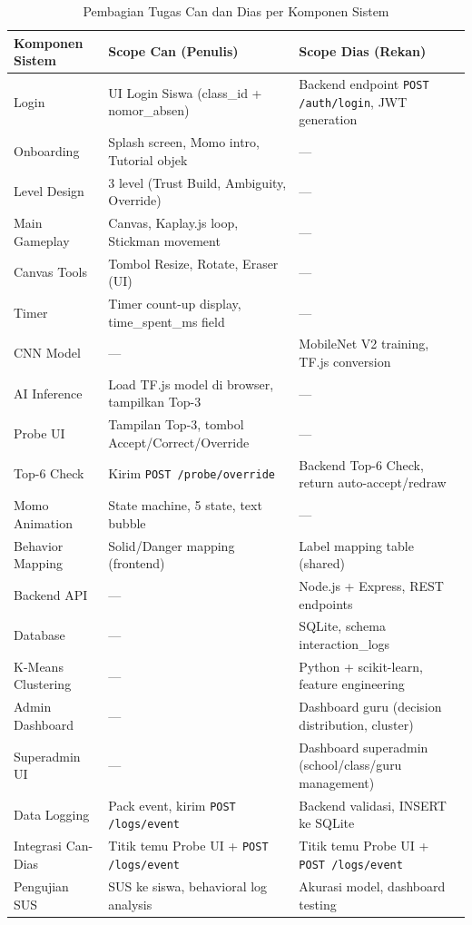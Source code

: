 \documentclass[12pt,a4paper,oneside,openany]{report}
\begin{document}
\begin{table}[H]
\centering
\caption{Pembagian Tugas Can dan Dias per Komponen Sistem}
\label{tab:pembagian-tugas}
\begin{tabular}{|p{4cm}|p{4.5cm}|p{4.5cm}|}
\hline
\textbf{Komponen Sistem} & \textbf{Scope Can (Penulis)} & \textbf{Scope Dias (Rekan)} \\ \hline
Login & UI Login Siswa (class\_id + nomor\_absen) & Backend endpoint \texttt{POST /auth/login}, JWT generation \\ \hline
Onboarding & Splash screen, Momo intro, Tutorial objek & --- \\ \hline
Level Design & 3 level (Trust Build, Ambiguity, Override) & --- \\ \hline
Main Gameplay & Canvas, Kaplay.js loop, Stickman movement & --- \\ \hline
Canvas Tools & Tombol Resize, Rotate, Eraser (UI) & --- \\ \hline
Timer & Timer count-up display, time\_spent\_ms field & --- \\ \hline
CNN Model & --- & MobileNet V2 training, TF.js conversion \\ \hline
AI Inference & Load TF.js model di browser, tampilkan Top-3 & --- \\ \hline
Probe UI & Tampilan Top-3, tombol Accept/Correct/Override & --- \\ \hline
Top-6 Check & Kirim \texttt{POST /probe/override} & Backend Top-6 Check, return auto-accept/redraw \\ \hline
Momo Animation & State machine, 5 state, text bubble & --- \\ \hline
Behavior Mapping & Solid/Danger mapping (frontend) & Label mapping table (shared) \\ \hline
Backend API & --- & Node.js + Express, REST endpoints \\ \hline
Database & --- & SQLite, schema interaction\_logs \\ \hline
K-Means Clustering & --- & Python + scikit-learn, feature engineering \\ \hline
Admin Dashboard & --- & Dashboard guru (decision distribution, cluster) \\ \hline
Superadmin UI & --- & Dashboard superadmin (school/class/guru management) \\ \hline
Data Logging & Pack event, kirim \texttt{POST /logs/event} & Backend validasi, INSERT ke SQLite \\ \hline
Integrasi Can-Dias & Titik temu Probe UI + \texttt{POST /logs/event} & Titik temu Probe UI + \texttt{POST /logs/event} \\ \hline
Pengujian SUS & SUS ke siswa, behavioral log analysis & Akurasi model, dashboard testing \\ \hline
\end{tabular}
\end{table}
\end{document}
